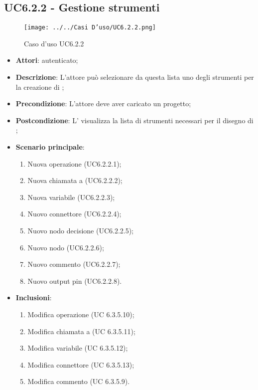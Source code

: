 \subsection{UC6.2.2 - Gestione strumenti }
\label{ssec:UC6.2.2}
\begin{figure}[H]
\centering
\texttt{[image: ../../Casi D'uso/UC6.2.2.png]}
\caption{Caso d'uso UC6.2.2}
 \end{figure}
\begin{itemize}
\item \textbf{Attori}:  autenticato;
\item \textbf{Descrizione}: L'attore può selezionare da questa lista uno degli strumenti per la creazione di ;
\item \textbf{Precondizione}: L'attore deve aver caricato un progetto;
\item \textbf{Postcondizione}: L' visualizza la lista di strumenti necessari per il disegno di ;
\item \textbf{Scenario principale}: \begin{enumerate}\item Nuova operazione (UC6.2.2.1);\item Nuova chiamata a  (UC6.2.2.2);\item Nuova variabile (UC6.2.2.3);\item Nuovo connettore (UC6.2.2.4);\item Nuovo nodo decisione (UC6.2.2.5);\item Nuovo nodo  (UC6.2.2.6);\item Nuovo commento (UC6.2.2.7);\item Nuovo output pin (UC6.2.2.8).
 \end{enumerate}
 \item \textbf{Inclusioni}: \begin{enumerate}
 \item Modifica operazione (UC 6.3.5.10);
 \item Modifica chiamata a  (UC 6.3.5.11);
 \item Modifica variabile (UC 6.3.5.12);
  \item Modifica connettore (UC 6.3.5.13);
  \item Modifica commento (UC 6.3.5.9).
 \end{enumerate}

\end{itemize}
